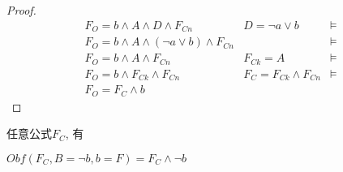 \begin{proof}
\begin{equation}
\begin{array}{ccc}
F_O  =  b\wedge A \wedge D\wedge F_{Cn}                 & D=\neg a\vee b~          &\models\\
F_O  =  b\wedge A \wedge (\neg a\vee b)\wedge F_{Cn}    &                          &\models\\
F_O  =  b\wedge A \wedge F_{Cn}                         &F_{Ck} =A                 &\models\\
F_O  =  b\wedge F_{Ck}\wedge F_{Cn}                     & F_C=F_{Ck} \wedge F_{Cn} &\models\\
F_O  =  F_C \wedge b                                    &   &
\end{array}
\end{equation}
\end{proof}

\begin{lemma}\label{3:UNSSE-lemma}
任意公式$F_C$, 有

 \textbf{$Obf(F_C,B=\neg b,{b=F})=F_C\wedge \neg b$}
\end{lemma}
